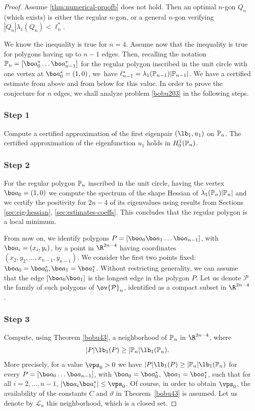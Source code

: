 \begin{proof}
Assume \eqref{thm:numerical-proofb} does not hold. Then an optimal $n$-gon $Q_n$ (which exists) is either the regular $n$-gon, or a general $n$-gon verifying $|Q_n|\lambda_1(Q_n) < \ell_n^*$.

We know the inequality is true for $n=4$. Assume now that the inequality is true for polygons having up to $n-1$ edges. Then, recalling the notation $\Bbb{P}_n=[\bo a_0^*\dots\bo a_{n-1}^*]$ for the regular polygon inscribed in the unit circle with one vertex at $\bo a_0^*=(1,0)$, we~have $\ell_{n-1}^* = \lambda_1(\Bbb P_{n-1})|\Bbb P_{n-1}|$.
We have a certified estimate from above and from below for this value. In order to prove the conjecture for $n$ edges, we shall analyze problem \eqref{bobu203} in the following steps.

\subsubsection*{Step 1} Compute a certified approximation of the first eigenpair $(\lb_1, u_1)$ on $\Bbb P_{n}$. The certified approximation of the eigenfunction $u_1$ holds in $H^1_0(\Bbb P_n)$.

\subsubsection*{Step 2} For the regular polygon $\Bbb{P}_n$ inscribed in the unit circle, having the vertex $\bo a_0 = (1,0)$ we compute the spectrum of the shape Hessian of $\lambda_1(\Bbb P_n)|\Bbb P_n|$ and we certify the positivity for $2n-4$ of its eigenvalues using results from Sections \ref{sec:eig-hessian}, \ref{sec:estimates-coeffs}. This concludes that the regular polygon is a local minimum.

From now on, we identify polygons $P=[\bo a_0\bo a_1\dots \bo a_{n-1}]$, with $\bo a_i=(x_i,y_i)$, by a point in $ \R^{2n-4}$ having coordinates $(x_2,y_2, \dots, x_{n-1}, y_{n-1})$. We consider the first two points fixed: $\bo a_0=\bo a_0^*, \bo a_1=\bo a_1^*$. Without restricting generality, we can assume that the edge $[\bo a_0\bo a_1]$ is the longest edge in the polygon $P$. Let us denote $\mathcal P$ the family of such polygons of $\ov {\mathcal P}_n$, identified as a compact subset in $\R^{2n-4}$.

\subsubsection*{Step 3} Compute, using Theorem \ref{bobu43}, a neighborhood of $\Bbb P_{n}$ in $\R^{2n-4}$, where
\[
|P|\lb_1(P) \ge |\Bbb P_n|\lb_1(\Bbb P_n).
\]
More precisely, for a value $\vps_0>0$ we have $|P| \lb_1(P) \ge |\Bbb{P}_n| \lb_1(\Bbb P_n)$ for every $P=[\bo a_0\dots \bo a_{n-1}]$, with $\bo a_0=\bo a_0^*$, $\bo a_1=\bo a_1^*$, such that for all $i=2,\dots, n-1$, $ |\bo a_i\bo a_i^*| \le \vps _0$. Of course, in order to obtain $\vps_0$, the availability of the constants $C$ and $ \vartheta$ in Theorem~\ref{bobu43} is assumed. Let us denote by $\mathcal L_n$ this neighborhood, which is a closed set.


\end{proof}
